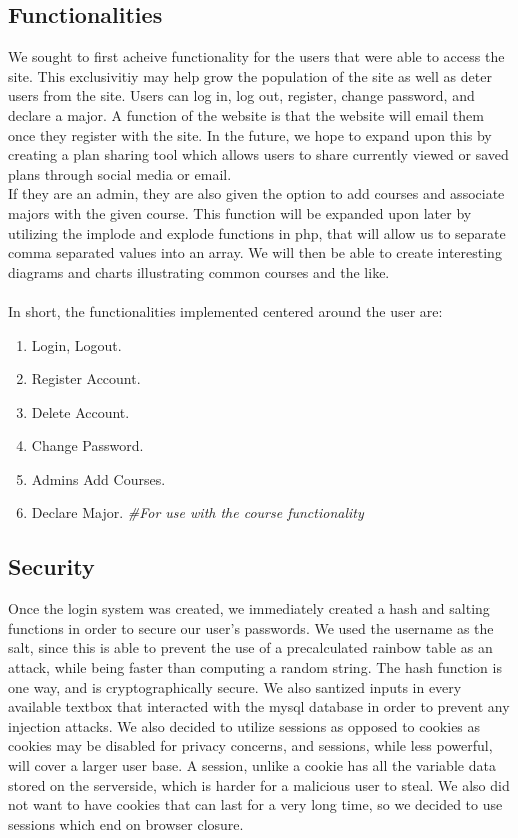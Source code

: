 \documentclass{article}
\begin{document}
\begin{doublespace}
\subsection*{Functionalities}
\indent We sought to first acheive functionality for the users that were able to access the site. This exclusivitiy may help grow the population of the site as well as deter users from the site. Users can log in, log out, register, change password, and declare a major. A function of the website is that the website will email them once they register with the site. In the future, we hope to expand upon this by creating a plan sharing tool which allows users to share currently viewed or saved plans through social media or email. \\
\indent If they are an admin, they are also given the option to add courses and associate majors with the given course. This function will be expanded upon later by utilizing the implode and explode functions in php, that will allow us to separate comma separated values into an array. We will then be able to create interesting diagrams and charts illustrating common courses and the like.\\
\\
\indent In short, the functionalities implemented centered around the user are:
\begin{enumerate}
\item Login, Logout.\\
\item Register Account.\\
\item Delete Account.
\item Change Password.\\
\item Admins Add Courses.\\
\item Declare Major. \emph{\#For use with the course functionality}\\
\end{enumerate}

\subsection*{Security}
\indent Once the login system was created, we immediately created a hash and salting functions in order to secure our user's passwords. We used the username as the salt, since this is able to prevent the use of a precalculated rainbow table as an attack, while being faster than computing a random string. The hash function is one way, and is cryptographically secure. We also santized inputs in every available textbox that interacted with the mysql database in order to prevent any injection attacks. We also decided to utilize sessions as opposed to cookies as cookies may be disabled for privacy concerns, and sessions, while less powerful, will cover a larger user base. A session, unlike a cookie has all the variable data stored on the serverside, which is harder for a malicious user to steal. We also did not want to have cookies that can last for a very long time, so we decided to use sessions which end on browser closure.


\end{doublespace}
\end{document}
